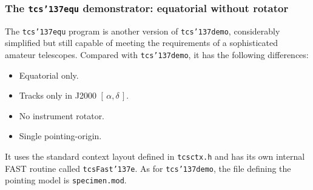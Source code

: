 \documentclass[12pt,fleqn,twoside]{article}
\renewcommand{\_}{{\tt\char'137}}     %
\newcommand{\radec}     {$[\,\alpha,\delta\,]$}
\begin{document}
\newpage
\subsubsection{The {\tt tcs\_equ} demonstrator: equatorial without rotator}
\label{tcs_equ}

The {\tt tcs\_equ} program is another version of {\tt tcs\_demo},
considerably simplified but still capable of
meeting the requirements of a sophisticated amateur
telescopes.  Compared with {\tt tcs\_demo}, it has
the following differences:
\begin{itemize}
\item Equatorial only.
\item Tracks only in J2000 \radec.
\item No instrument rotator.
\item Single pointing-origin.
\end{itemize}
It uses the standard context layout defined in {\tt tcsctx.h} and
has its own internal FAST routine called {\tt tcsFast\_e}.  As
for {\tt tcs\_demo}, the
file defining the pointing model is {\tt specimen.mod}.
\end{document}
